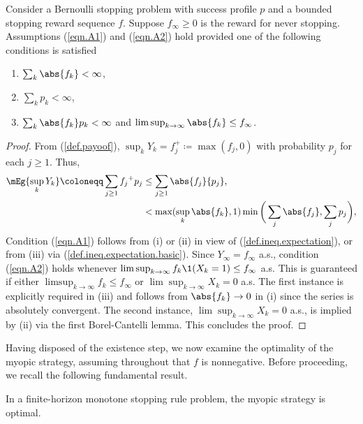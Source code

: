 \documentclass[11pt]{article}
\begin{document}
\begin{thm}\label{def.existence}
	
	Consider a Bernoulli stopping problem with success profile $p$ and a bounded  stopping reward sequence $f$. Suppose  $f_\infty \ge  0$ is the reward for never stopping. Assumptions (\ref{eqn.A1}) and (\ref{eqn.A2}) hold provided one of the following conditions is satisfied 
	\begin{enumerate}[label=\rm(\roman*)]
		\item$ \sum_k \abs{f_k} < \infty$,%
		\item $\sum_k p_k < \infty$, 
		\item $\sum_k {\abs{f_k}}p_k < \infty$ and $\limsup_{k \to \infty} \abs{{f_k}} \le f_\infty$.
	\end{enumerate}
\end{thm}
\begin{proof}
	From (\ref{def.payoof}), 
	$\sup_k {{Y_k}} = f_j^+ \coloneqq \max(f_j, 0)$ with probability $p_j$ for each $j \ge 1$.  Thus,
	\begin{alignat}{2}
		\mEg{\sup_k {{Y_k}}} \coloneqq  \sum_{j \ge 1}   {f_j}^+ {p_j}
		&\le  \sum_{j \ge 1}   \abs{f_j} {p_j},  \label{def.ineq.expectation.basic}\\%
		&< \max( \sup_k \abs{f_k}, 1) \min\bigg( \sum_j \abs{f_j},  \sum_j p_j\bigg)		\label{def.ineq.expectation},
	\end{alignat}
	Condition (\ref{eqn.A1}) follows from \rm(i) or  \rm(ii) in view of (\ref{def.ineq.expectation}),  or from \rm(iii) via (\ref{def.ineq.expectation.basic}). Since  $Y_\infty = f_\infty$ a.s.,  condition (\ref{eqn.A2}) holds whenever $\limsup_{k \to \infty} f_k \1(X_k = 1) \le f_\infty$ a.s. This is guaranteed if either $\limsup_{k \to \infty} {f_k}  \le f_\infty$ or  $\lim\sup_{k \to \infty} X_k =0$ a.s.  The first instance is explicitly required in \rm(iii) and follows from $\abs{f_k} \to 0$ in \rm(i) 
	 since the series is absolutely convergent. The second instance, $\lim\sup_{k \to \infty} X_k =0$ a.s.,  is implied by  \rm(ii)  via the first Borel-Cantelli lemma. 
	 This concludes the proof.
\end{proof}

\noindent Having disposed of the existence step, we now examine the optimality of the myopic strategy, assuming throughout that $f$ is  nonnegative. Before proceeding, we recall the following fundamental result.%
\begin{thm}\label{thm.monotone.finite}
	In a finite-horizon monotone stopping rule problem, the myopic strategy is optimal.
\end{thm}
\end{document}
